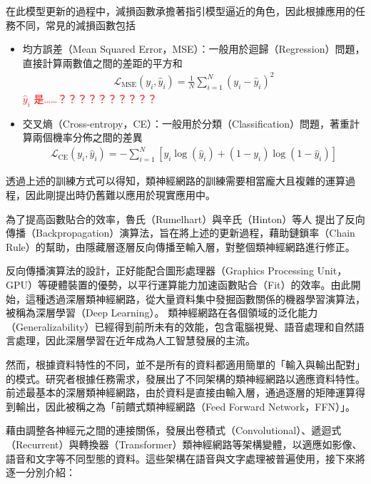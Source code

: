         在此模型更新的過程中，減損函數承擔著指引模型逼近的角色，因此根據應用的任務不同，常見的減損函數包括
\begin{itemize}
    \item 均方誤差（Mean Squared Error，MSE）：一般用於迴歸（Regression）問題，直接計算兩數值之間的差距的平方和
          \begin{align}
              \mathcal{L}_{\text{MSE}}(y_i, \hat{y}_i) = \frac{1}{N} \sum_{i=1}^{N} (y_i - \hat{y}_i)^2
          \end{align}
          \textcolor{red}{\(\hat{y}_i\) 是……？？？？？？？？？？}
    \item 交叉熵（Cross-entropy，CE）：一般用於分類（Classification）問題，著重計算兩個機率分佈之間的差異
          \begin{align}
              \mathcal{L}_{\text{CE}}(y_i, \hat{y}_i) = - \sum_{i=1}^{N} \left[ y_i \log(\hat{y}_i) + (1 - y_i) \log(1 - \hat{y}_i) \right]
          \end{align}
\end{itemize}

        透過上述的訓練方式可以得知，類神經網路的訓練需要相當龐大且複雜的運算過程，因此剛提出時仍舊難以應用於現實應用中。

        為了提高函數貼合的效率，魯氏（Rumelhart）與辛氏（Hinton）等人 \cite{rumelhart_learning_1986, rumelhart_learning_1987} 提出了反向傳播（Backpropagation）演算法，旨在將上述的更新過程，藉助鏈鎖率（Chain Rule）的幫助，由隱藏層逐層反向傳播至輸入層，對整個類神經網路進行修正。

        反向傳播演算法的設計，正好能配合圖形處理器（Graphics Processing Unit，GPU）等硬體裝置的優勢，以平行運算能力加速函數貼合（Fit）的效率。由此開始，這種透過深層類神經網路，從大量資料集中發掘函數關係的機器學習演算法，被稱為深層學習（Deep Learning）。 類神經網路在各個領域的泛化能力（Generalizability）已經得到前所未有的效能，包含電腦視覺、語音處理和自然語言處理，因此深層學習在近年成為人工智慧發展的主流。

        然而，根據資料特性的不同，並不是所有的資料都適用簡單的「輸入與輸出配對」的模式。研究者根據任務需求，發展出了不同架構的類神經網路以適應資料特性。前述最基本的深層類神經網路，由於資料是直接由輸入層，通過逐層的矩陣運算得到輸出，因此被稱之為「前饋式類神經網路（Feed Forward Network，FFN）」。

        藉由調整各神經元之間的連接關係，發展出卷積式（Convolutional）、遞迴式（Recurrent）與轉換器（Transformer）類神經網路等架構變體，以適應如影像、語音和文字等不同型態的資料。這些架構在語音與文字處理被普遍使用，接下來將逐一分別介紹：

